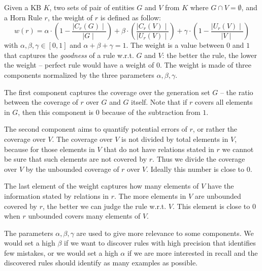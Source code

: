 Given a KB $K$, two sets of pair of entities $G$ and $V$ from $K$ where $G \cap V = \emptyset$, and a Horn Rule $r$, the weight of $r$ is defined as follow:
\begin{equation} \label{eq:weight_fun}
	w(r) = \alpha \cdot (1-\frac{\mid C_{r}(G)\mid}{\mid G \mid}) +\beta \cdot (\frac{\mid C_{r}(V) \mid}{\mid U_{r}(V)\mid})  +\gamma \cdot (1-\frac{\mid U_{r}(V)\mid}{\mid V \mid})
\end{equation}
with $\alpha,\beta,\gamma \in [0,1]$ and $\alpha + \beta + \gamma = 1$. The weight is a value between $0$ and $1$ that captures the \emph{goodness} of a rule w.r.t. $G$ and $V$: the better the rule, the lower the weight -- perfect rule would have a weight of $0$. The weight is made of three components normalized by the three parameters $\alpha,\beta,\gamma$.
\begin{inparaenum}[\itshape(i)]
	\item The first component captures the coverage over the generation set $G$ -- the ratio between the coverage of $r$ over $G$ and $G$ itself. Note that if $r$ covers all elements in $G$, then this component is $0$ because of the subtraction from $1$.
	\item The second component aims to quantify potential errors of $r$, or rather the coverage over $V$. The coverage over $V$ is not divided by total elements in $V$, because 
	for those elements in $V$ that do not have relations stated in $r$ we cannot be sure that such elements are not covered by $r$. Thus we divide the coverage over $V$ by the unbounded coverage of $r$ over $V$. Ideally this number is close to $0$.
	\item The last element of the weight captures how many elements of $V$ have the information stated by relations in $r$. The more elements in $V$ are unbounded covered by $r$, the better we can judge the rule w.r.t. $V$. This element is close to $0$ when $r$ unbounded covers many elements of $V$. 
\end{inparaenum}
The parameters $\alpha,\beta,\gamma$ are used to give more relevance to some components. We would set a high $\beta$ if we want to discover rules with high precision that identifies few mistakes, or we would set a high $\alpha$ if we are more interested in recall and the discovered rules should identify as many examples as possible.

